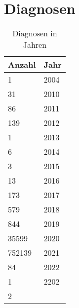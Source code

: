 \section{Diagnosen}
\begin{center}
 \begin{longtable}{|p{2.3cm}|p{2.5cm}|}
  \caption{Diagnosen in Jahren} \\
  \hline
\rowcolor{lightgray} Anzahl & Jahr \\ \hline
\endhead
1 & 2004 \\ \hline
31 & 2010 \\ \hline
86 & 2011 \\ \hline
139 & 2012 \\ \hline
1 & 2013 \\ \hline
6 & 2014 \\ \hline
3 & 2015 \\ \hline
13 & 2016 \\ \hline
173 & 2017 \\ \hline
579 & 2018 \\ \hline
844 & 2019 \\ \hline
35599 & 2020 \\ \hline
752139 & 2021 \\ \hline
84 & 2022 \\ \hline
1 & 2202 \\ \hline
2 &  \\ \hline
\end{longtable}
\end{center}
